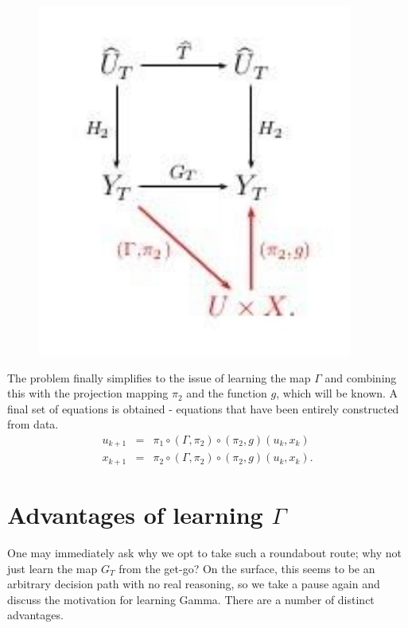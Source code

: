 \documentclass[a4paper,12pt,twoside]{book}
\begin{document}
\begin{figure}[ht] \label{Fig_Gamma}
  \includegraphics[scale=0.3]{gammatemp.png}
  \centering
  \label{fig:conjugacy_with_Gamma}
\end{figure}

The problem finally simplifies to the issue of learning the map $\Gamma$ and combining this with the projection mapping $\pi_2$ and the function $g$, which will be known. A final set of equations is obtained - equations that have been entirely constructed from data.
\begin{eqnarray}
	u_{k+1} &=& \pi_1 \circ (\Gamma, \pi_2) \circ (\pi_2,g) (u_k,x_k) \label{Seqn_u}\\
	x_{k+1} &=& \pi_2 \circ (\Gamma, \pi_2) \circ (\pi_2,g) (u_k,x_k). \label{Seqn_x}
\end{eqnarray}



\section{Advantages of learning $\Gamma$} \label{subs_LearnGamma}

One may immediately ask why we opt to take such a roundabout route; why not just learn the map $G_T$ from the get-go? On the surface, this seems to be an arbitrary decision path with no real reasoning, so we take a pause again and discuss the motivation for learning Gamma.
There are a number of distinct advantages. 
\end{document}
